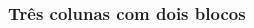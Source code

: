 \documentclass[aspectratio=169]{beamer}
\begin{document}

\begin{frame}[fragile] \frametitle{Três colunas com dois blocos}
\vspace{-1em}
\begin{columns}[t]
\begin{column}{0.32\linewidth}
  \begin{exampleblock}{} \centering
  \end{exampleblock}
  \vspace{0.5em}
  \begin{block}{\lipsum[2][5]}
    \lipsum[2][6]
  \end{block}
\end{column}
\begin{column}{0.32\linewidth}
  \begin{exampleblock}{} \centering
  \end{exampleblock}
  \vspace{0.5em}
  \begin{block}{\lipsum[2][7]}
    \lipsum[2][8]
  \end{block}
\end{column}
\begin{column}{0.32\linewidth}
  \begin{exampleblock}{} \centering
  \end{exampleblock}
  \vspace{0.5em}
  \begin{block}{\lipsum[2][10]}
    \lipsum[2][10]
  \end{block}
\end{column}
\end{columns}
\end{frame}

\end{document}
